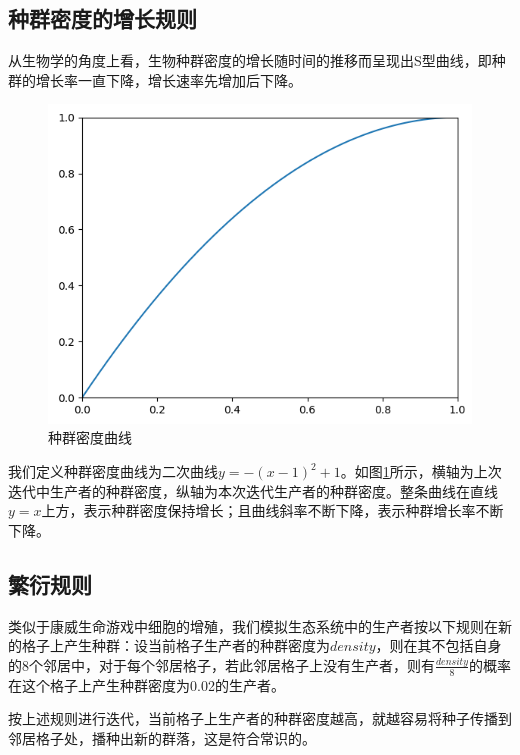 \documentclass{ctexart}
\begin{document}
\subsection{种群密度的增长规则} \label{sec:density-growth-curve}

从生物学的角度上看，生物种群密度的增长随时间的推移而呈现出S型曲线，即种群的增长率一直下降，增长速率先增加后下降。

\begin{figure}[ht]
  \centering
  \includegraphics[scale=0.6]{density-curve.png}
  \caption{种群密度曲线}
  \label{fig:density-curve}
\end{figure}

我们定义种群密度曲线为二次曲线$y = -(x-1)^2 + 1$。如图\ref{fig:density-curve}所示，横轴为上次迭代中生产者的种群密度，纵轴为本次迭代生产者的种群密度。整条曲线在直线$y=x$上方，表示种群密度保持增长；且曲线斜率不断下降，表示种群增长率不断下降。

\subsection{繁衍规则}

类似于康威生命游戏中细胞的增殖，我们模拟生态系统中的生产者按以下规则在新的格子上产生种群：设当前格子生产者的种群密度为$density$，则在其不包括自身的8个邻居中，对于每个邻居格子，若此邻居格子上没有生产者，则有$\frac{density}{8}$的概率在这个格子上产生种群密度为0.02的生产者。

按上述规则进行迭代，当前格子上生产者的种群密度越高，就越容易将种子传播到邻居格子处，播种出新的群落，这是符合常识的。
\end{document}

